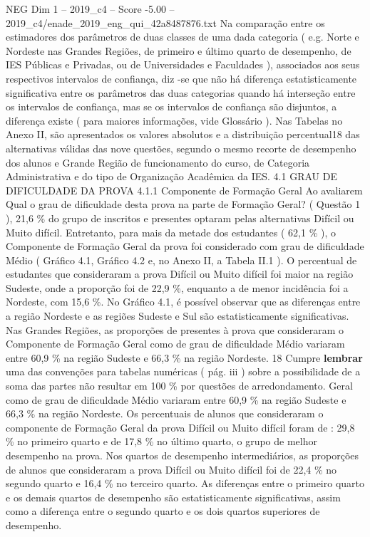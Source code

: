 \begin{textsample}{NEG Dim 1 – 2019\_c4 – Score -5.00 – 2019\_c4/enade\_2019\_eng\_qui\_42a8487876.txt}
Na comparação entre os estimadores dos parâmetros de duas classes de uma dada categoria ( e.g.
Norte e Nordeste nas Grandes Regiões, de primeiro e último quarto de desempenho, de IES Públicas e Privadas, ou de Universidades e Faculdades ), associados aos seus respectivos intervalos de confiança, diz -se que não há diferença estatisticamente significativa entre os parâmetros das duas categorias quando há interseção entre os intervalos de confiança, mas se os intervalos de confiança são disjuntos, a diferença existe ( para maiores informações, vide Glossário ).
Nas Tabelas no Anexo II, são apresentados os valores absolutos e a distribuição percentual18 das alternativas válidas das nove questões, segundo o mesmo recorte de desempenho dos alunos e Grande Região de funcionamento do curso, de Categoria Administrativa e do tipo de Organização Acadêmica da IES. 4.1 GRAU DE DIFICULDADE DA PROVA 4.1.1 Componente de Formação Geral Ao avaliarem Qual o grau de dificuldade desta prova na parte de Formação Geral? ( Questão 1 ), 21,6 \% do grupo de inscritos e presentes optaram pelas alternativas Difícil ou Muito difícil.
Entretanto, para mais da metade dos estudantes ( 62,1 \% ), o Componente de Formação Geral da prova foi considerado com grau de dificuldade Médio ( Gráfico 4.1, Gráfico 4.2 e, no Anexo II, a Tabela II.1 ).
O percentual de estudantes que consideraram a prova Difícil ou Muito difícil foi maior na região Sudeste, onde a proporção foi de 22,9 \%, enquanto a de menor incidência foi a Nordeste, com 15,6 \%.
No Gráfico 4.1, é possível observar que as diferenças entre a região Nordeste e as regiões Sudeste e Sul são estatisticamente significativas.
Nas Grandes Regiões, as proporções de presentes à prova que consideraram o Componente de Formação Geral como de grau de dificuldade Médio variaram entre 60,9 \% na região Sudeste e 66,3 \% na região Nordeste. 18 Cumpre \textbf{lembrar} uma das convenções para tabelas numéricas ( pág. iii ) sobre a possibilidade de a soma das partes não resultar em 100 \% por questões de arredondamento.
Geral como de grau de dificuldade Médio variaram entre 60,9 \% na região Sudeste e 66,3 \% na região Nordeste.
Os percentuais de alunos que consideraram o componente de Formação Geral da prova Difícil ou Muito difícil foram de : 29,8 \% no primeiro quarto e de 17,8 \% no último quarto, o grupo de melhor desempenho na prova.
Nos quartos de desempenho intermediários, as proporções de alunos que consideraram a prova Difícil ou Muito difícil foi de 22,4 \% no segundo quarto e 16,4 \% no terceiro quarto.
As diferenças entre o primeiro quarto e os demais quartos de desempenho são estatisticamente significativas, assim como a diferença entre o segundo quarto e os dois quartos superiores de desempenho.

\end{textsample}
